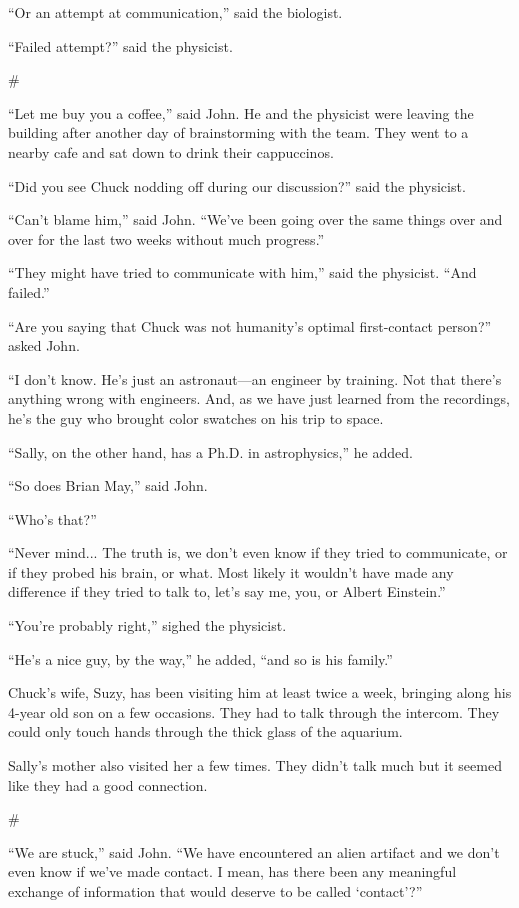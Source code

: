 \documentclass[12pt]{book}
\newcommand{\sbreak}{
\begin{center}
  \#
\end{center}
}
\begin{document}
``Or an attempt at communication,'' said the biologist. 

``Failed attempt?'' said the physicist.

\sbreak

``Let me buy you a coffee,'' said John. He and the physicist were leaving the building after another day of brainstorming with the team. They went to a nearby cafe and sat down to drink their cappuccinos.

``Did you see Chuck nodding off during our discussion?'' said the physicist.

``Can't blame him,'' said John. ``We've been going over the same things over and over for the last two weeks without much progress.''

``They might have tried to communicate with him,'' said the physicist. ``And failed.''

``Are you saying that Chuck was not humanity's optimal first-contact person?'' asked John.

``I don't know. He's just an astronaut---an engineer by training. Not that there's anything wrong with engineers. And, as we have just learned from the recordings, he's the guy who brought color swatches on his trip to space.

``Sally, on the other hand, has a Ph.D. in astrophysics,'' he added.

``So does Brian May,'' said John.

``Who's that?''

``Never mind... The truth is, we don't even know if they tried to communicate, or if they probed his brain, or what. Most likely it wouldn't have made any difference if they tried to talk to, let's say me, you, or Albert Einstein.''

``You're probably right,'' sighed the physicist.

``He's a nice guy, by the way,'' he added, ``and so is his family.'' 

Chuck's wife, Suzy, has been visiting him at least twice a week, bringing along his 4-year old son on a few occasions. They had to talk through the intercom. They could only touch hands through the thick glass of the aquarium. 

Sally's mother also visited her a few times. They didn't talk much but it seemed like they had a good connection. 

\sbreak

``We are stuck,'' said John. ``We have encountered an alien artifact and we don't even know if we've made contact. I mean, has there been any meaningful exchange of information that would deserve to be called `contact'?''
\end{document}
